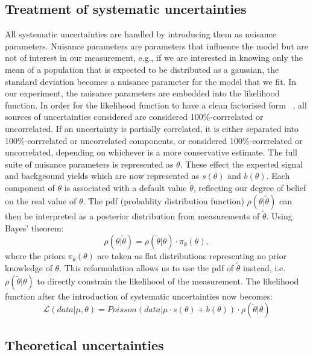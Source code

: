 \subsection{Treatment of systematic uncertainties}
All systematic uncertainties are handled by introducing them as nuisance parameters. Nuisance parameters are parameters that influence the model but are not of interest in our measurement, e.g., if we are interested in knowing only the mean of a population that is expected to be distributed as a gaussian, the standard deviation becomes a nuisance parameter for the model that we fit. In our experiment, the nuisance parameters are embedded into the likelihood function. In order for the likelihood function to have a clean factorised form ~\cite{note2011}, all sources of uncertainties considered are considered 100\%-corrrelated or uncorrelated. If an uncertainty is partially correlated, it is either separated into 100\%-corrrelated or uncorrelated components, or considered 100\%-corrrelated or uncorrelated, depending on whichever is a more conservative estimate. The full suite of nuisance parameters is represented as $\theta$. These effect the expected signal and backgeound yields which are now represented as $s(\theta)$ and $b(\theta)$. Each component of $\theta$ is associated with a default value $\tilde{\theta}$, reflecting our degree of belief on the real value of $\theta$. The pdf (probablity distribution function) $\rho(\theta|\tilde{\theta})$ can then be interpreted as a posterior distribution from measurements of $\tilde{\theta}$. Using Bayes' theorem:
\begin{equation*}
  \rho(\theta|\tilde{\theta})=\rho(\tilde{\theta}|\theta)\cdot\pi_\theta(\theta),
\end{equation*}
where the priors $\pi_\theta(\theta)$ are taken as flat distributions representing no prior knowledge of $\theta$. This reformulation allows us to use the pdf of $\tilde{\theta}$ instead, i.e. $\rho(\tilde{\theta}|\theta)$  to directly constrain the likelihood of the measurement. The likelihood function after the introduction of systematic uncertainties now becomes:
\begin{equation*}                                                                                                                               \mathcal{L}(data|\mu,\theta)=Poisson(data|\mu\cdot s(\theta) + b(\theta))\cdot\rho(\tilde{\theta}|\theta)
\end{equation*}



\subsection{Theoretical uncertainties}
\label{theo_uncert}

